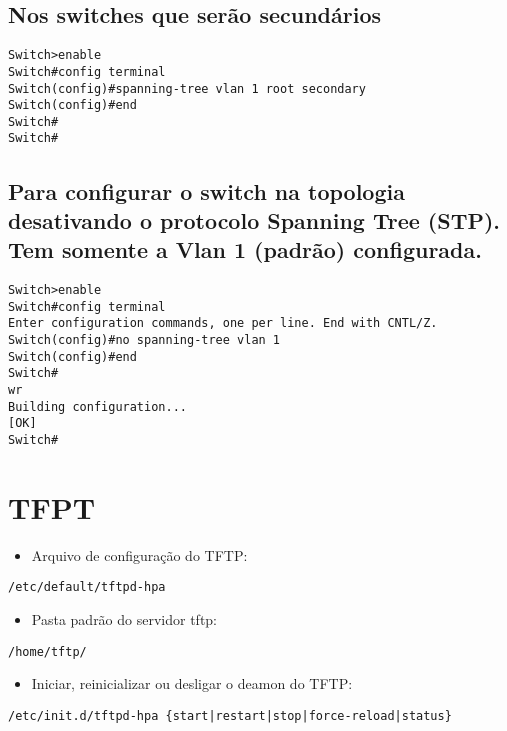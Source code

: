 \documentclass[]{article}
\begin{document}
\subsection{Nos switches que serão
secundários}\label{nos-switches-que-seruxe3o-secunduxe1rios}

\begin{verbatim}
Switch>enable
Switch#config terminal
Switch(config)#spanning-tree vlan 1 root secondary
Switch(config)#end
Switch#
Switch#
\end{verbatim}

\subsection{Para configurar o switch na topologia desativando o
protocolo Spanning Tree (STP). Tem somente a Vlan 1 (padrão)
configurada.}\label{para-configurar-o-switch-na-topologia-desativando-o-protocolo-spanning-tree-stp.-tem-somente-a-vlan-1-padruxe3o-configurada.}

\begin{verbatim}
Switch>enable
Switch#config terminal
Enter configuration commands, one per line. End with CNTL/Z.
Switch(config)#no spanning-tree vlan 1
Switch(config)#end
Switch#
wr
Building configuration...
[OK]
Switch#
\end{verbatim}

\section{TFPT}\label{tfpt}

\begin{itemize}
\itemsep1pt\parskip0pt
\item
  Arquivo de configuração do TFTP:
\end{itemize}

\texttt{/etc/default/tftpd-hpa}

\begin{itemize}
\itemsep1pt\parskip0pt
\item
  Pasta padrão do servidor tftp:
\end{itemize}

\texttt{/home/tftp/}

\begin{itemize}
\itemsep1pt\parskip0pt
\item
  Iniciar, reinicializar ou desligar o deamon do TFTP:
\end{itemize}

\begin{verbatim}
/etc/init.d/tftpd-hpa {start|restart|stop|force-reload|status}
\end{verbatim}
\end{document}
